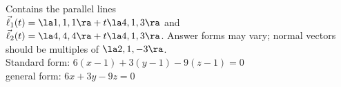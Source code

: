 {Contains the parallel lines\\
$\vec\ell_1(t) = \la 1,1,1\ra + t\la 4,1,3\ra$ and \\
$\vec\ell_2(t) = \la 4,4,4\ra + t\la 4,1,3\ra$.
}
{Answer forms may vary; normal vectors should be multiples of $\la 2,1,-3\ra$.\\
Standard form: $6(x-1)+3(y-1)-9(z-1)=0$\\
general form: $6x+3y-9z=0$
}

